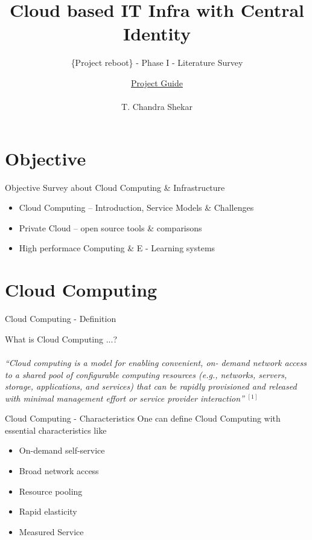 \documentclass[xcolor=dvipsnames]{beamer}
\title[Cloud based IT Infra with Central Identity]{Cloud based IT Infra with Central Identity}
\subtitle{\{Project reboot\} - Phase I - Literature Survey  }
\author{ \underline{Project Guide} \\ \hspace{2mm} \\ \small{ T. Chandra Shekar }  }
\institute{ \underline{Presenting by} \\ \hspace{2mm} \\ \textit {Aneesh Kumar | N090247 }  \\ \hspace{4mm} \\ \textit{Dept. of CSE, RGUKT - Nuzvid}}
\begin{document}
\begin{frame}
\titlepage
\end{frame}

\section{Objective}
\begin{frame}{Objective}
Survey about Cloud Computing \& Infrastructure 
\begin{itemize}

\item Cloud Computing -- Introduction, Service Models \& Challenges
\item Private Cloud -- open source tools \& comparisons
\item High performace Computing \& E - Learning systems

\end{itemize}
\end{frame}

\section{Cloud Computing}
\begin{frame}{Cloud Computing - Definition }

What is Cloud Computing ...? \\
\hspace{4cm} \\
\textit{``Cloud computing is a model for enabling convenient, on-
demand network access to a shared pool of configurable
computing resources (e.g., networks, servers, storage,
applications, and services) that can be rapidly provisioned
and released with minimal management effort or service
provider interaction''} $ ^{[1]} $

\end{frame}

\begin{frame} {Cloud Computing - Characteristics }
One can define Cloud Computing with essential characteristics like

\begin{itemize}
\item On-demand self-service
\item Broad network access
\item Resource pooling
\item Rapid elasticity
\item Measured Service
\end{itemize}
\end{frame}
\end{document}
